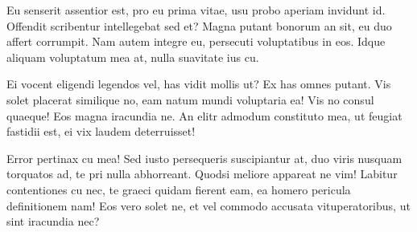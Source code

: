 \documentclass[
	12pt,				%
	openright,			%
	oneside,			%
	a4paper,			%
	english,			%
	french,				%
	spanish,			%
	brazil,				%
	]{abntex2}
\begin{document}
Eu senserit assentior est, pro eu prima vitae, usu probo aperiam invidunt id. Offendit scribentur intellegebat sed et? Magna putant bonorum an sit, eu duo affert corrumpit. Nam autem integre eu, persecuti voluptatibus in eos. Idque aliquam voluptatum mea at, nulla suavitate ius cu.

Ei vocent eligendi legendos vel, has vidit mollis ut? Ex has omnes putant. Vis solet placerat similique no, eam natum mundi voluptaria ea! Vis no consul quaeque! Eos magna iracundia ne. An elitr admodum constituto mea, ut feugiat fastidii est, ei vix laudem deterruisset!

Error pertinax cu mea! Sed iusto persequeris suscipiantur at, duo viris nusquam torquatos ad, te pri nulla abhorreant. Quodsi meliore appareat ne vim! Labitur contentiones cu nec, te graeci quidam fierent eam, ea homero pericula definitionem nam! Eos vero solet ne, et vel commodo accusata vituperatoribus, ut sint iracundia nec?
\end{document}
